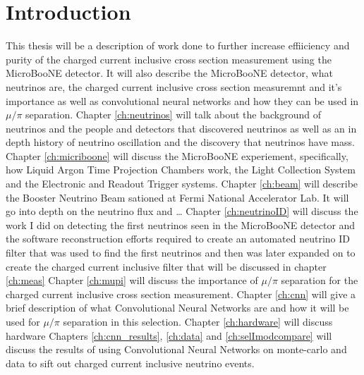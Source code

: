 \chapter{Introduction}
This thesis will be a description of work done to further increase effiiciency and purity of the charged current inclusive cross section measurement using the MicroBooNE detector. It will also describe the MicroBooNE detector, what neutrinos are, the charged current inclusive cross section measuremnt and it's importance as well as convolutional neural networks and how they can be used in $\mu/\pi$ separation. 
Chapter \ref{ch:neutrinos} will talk about the background of neutrinos and the people and detectors that discovered neutrinos as well as an in depth history of neutrino oscillation and the discovery that neutrinos have mass. 
Chapter \ref{ch:micriboone} will discuss the MicroBooNE experiement, specifically,  how Liquid Argon Time Projection Chambers work, the Light Collection System and the Electronic and Readout Trigger systems.
Chapter \ref{ch:beam} will describe the Booster Neutrino Beam sationed at Fermi National Accelerator Lab. It will go into depth on the neutrino flux and \dots
Chapter \ref{ch:neutrinoID} will discuss the work I did on detecting the first neutrinos seen in the MicroBooNE detector and the software reconstruction efforts required to create an automated neutrino ID filter that was used to find the first neutrinos and then was later expanded on to create the charged current inclusive filter that will be discussed in chapter \ref{ch:meas}
Chapter \ref{ch:mupi} will discuss the importance of $\mu/\pi$ separation for the charged current inclusive cross section measurement.
Chapter \ref{ch:cnn} will give a brief description of what Convolutional Neural Networks are and how it will be used for $\mu/\pi$ separation in this selection. 
Chapter \ref{ch:hardware} will discuss hardware
Chapters \ref{ch:cnn_results}, \ref{ch:data} and \ref{ch:selImodcompare} will discuss the results of using Convolutional Neural Networks on monte-carlo and data to sift out charged current inclusive neutrino events. 
